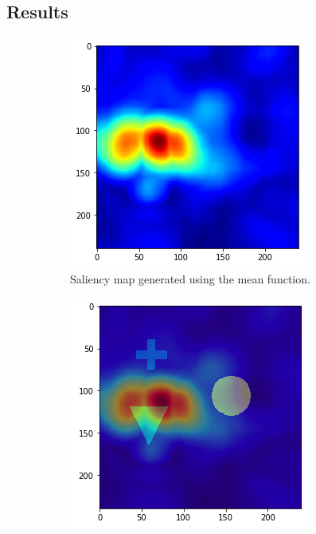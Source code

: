 \subsection{Results}
\begin{figure}[H]
    \centering
    \begin{subfigure}[t]{.5\textwidth}
        \centering
        \includegraphics[width=\linewidth]{chapters/05_testnet/images/rise_1-0.png}
        \caption{Saliency map generated using the mean function.}
    \end{subfigure}%
    \begin{subfigure}[t]{.5\textwidth}
        \centering
        \includegraphics[width=\linewidth]{chapters/05_testnet/images/rise_1-1.png}

\end{subfigure}
\end{figure}
